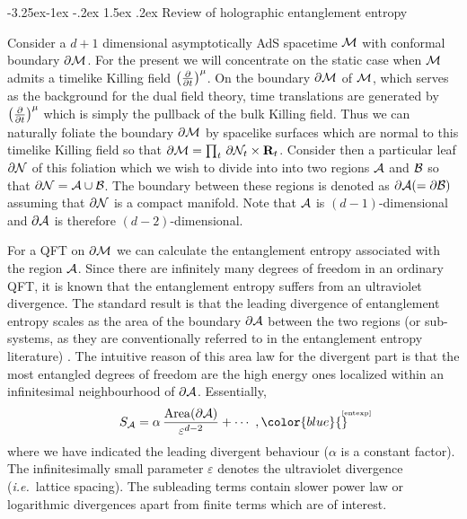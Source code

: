 \documentclass[12pt]{article}
\makeatletter
\renewcommand\subsection{\@startsection{subsection}{2}{\z@}%
                                     {-3.25ex\@plus -1ex \@minus -.2ex}%
                                     {1.5ex \@plus .2ex}%
                                     {\normalfont\bfseries}}
\def\({\left (}
\def\){\right )}
\def\ie{{\it i.e.}}
\def\a{\alpha}
\def\veps{\varepsilon}
\def\p{\partial}
\def\CA{{\cal A}}
\def\CB{{\cal B}}
\def\R{{\bf R}}
\def\p{\partial}
\def\p{\partial}
\def\Label#1{\label{#1}%
{ \color{blue}{\smash{\hbox to0pt{\raise2ex\hbox{\tiny[#1]}\hss}}}}}
\def\bulk{{\cal M}}
\def\bdy{\p{\cal M}}
\def\bdys{\p{\cal N}}
\def\rA{\CA}
\def\rB{\CB}
\def\brA{\p \CA}
\def\area#1{{\rm Area}(#1)}
\def\ptm{\({\p \over \p t}\)^\mu}
\def\cof{{\veps}}
\def\de{\partial}
\def\ap{\alpha}
\makeatother
\begin{document}
\subsection{Review of holographic entanglement entropy}
\label{minsurTT}

Consider a $d+1$ dimensional asymptotically AdS spacetime $\bulk$ with conformal
boundary $\bdy$. For the present we will concentrate on the static case when $\bulk$ admits
 a timelike Killing field $\ptm$. On the boundary $\bdy$  of $\bulk$, which serves as the
 background for the dual field theory,  time translations are generated by $\ptm$ which is
 simply the pullback of the bulk Killing field. Thus we can naturally foliate the boundary $\bdy$
 by spacelike surfaces which are normal to this  timelike Killing field so that
 $\bdy = \prod_t\, \bdys_t \times \R_t$. Consider then  a particular leaf $\bdys$ of
 this foliation which we wish to divide into into two regions $\rA$ and $\rB$ so that
  $\bdys = \rA \cup \rB$.  The boundary between these regions is denoted as $\brA(=\de{\cal  B})$
  assuming that $\bdys$ is a compact manifold.  Note that $\rA$ is $(d-1)$-dimensional and $\brA$
  is therefore $(d-2)$-dimensional.

For a QFT on $\bdy$ we can calculate the entanglement entropy
associated with the region $\rA$. Since there are infinitely many
degrees of freedom in an ordinary QFT, it is known that the
entanglement entropy suffers from an ultraviolet divergence. The
standard result is that the leading divergence of entanglement
entropy scales as the area of the boundary $\brA$ between the two
regions (or sub-systems, as they are conventionally referred to in
the entanglement entropy literature)
\cite{Bombelli:1986rw,Srednicki:1993im}. The intuitive reason of
this area law for the divergent part is that the most entangled
degrees of freedom are the high energy ones localized within an
infinitesimal neighbourhood of $\brA$.
  Essentially,
%
\begin{equation}
S_\rA = \a \, {\area{\brA} \over \cof^{d-2} } + \cdots \ ,
\Label{entexp}
\end{equation}
%
where we have indicated the leading divergent behaviour ($\ap$ is a
constant factor). The infinitesimally small parameter $\cof$ denotes
the ultraviolet divergence (\ie\ lattice spacing). The subleading
terms contain slower power law or logarithmic divergences apart from
finite terms which are of interest.
\end{document}
